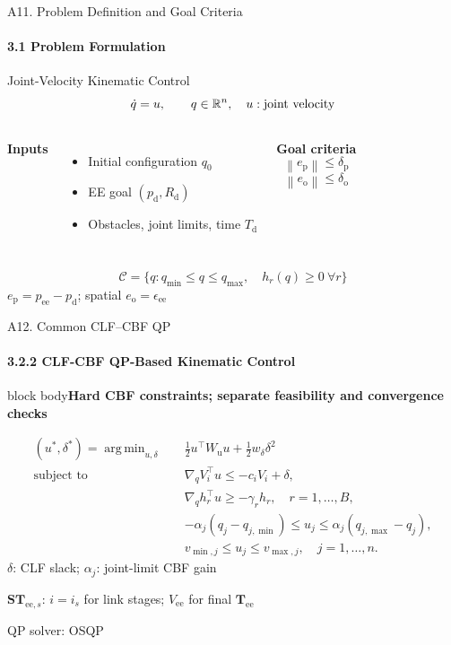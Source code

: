 \documentclass[t,10pt,handout]{beamer}
\newcommand{\takeaway}[1]{\par\begin{beamercolorbox}[sep=2mm,wd=\linewidth]{block body}\color{black}\textbf{#1}\end{beamercolorbox}\par\vspace{2mm}}
\newcommand{\ee}{\mathrm{ee}}
\newcommand{\regtask}{\mathbf{T}_{\ee}}
\newcommand{\subtask}[1]{\mathbf{ST}_{\ee,#1}}
\newcommand{\norm}[1]{\left\lVert#1\right\rVert}
\DeclareMathOperator*{\argmin}{arg\,min}
\newenvironment{slidebody}{\begin{minipage}[t][68.5mm][s]{\linewidth}\vspace{0pt}}{\par\vspace{0pt}\end{minipage}}
\begin{document}
\begin{frame}{A11. Problem Definition and Goal Criteria}
  \hypertarget{appendix-a11}{}
  \framesubtitle{3.1 Problem Formulation}
  \begin{slidebody}
    \begin{block}{Joint-Velocity Kinematic Control}
      \[\dot q=u,\qquad q\in{\mathbb R}^n,\quad u:\text{joint velocity}\]
    \end{block}
    \vfill
    \begin{columns}[T,onlytextwidth]
      \textbf{Inputs}
      \begin{itemize}\setlength{\itemsep}{3mm}
        \item Initial configuration $q_0$
        \item EE goal $(p_{\mathrm d},R_{\mathrm d})$
        \item Obstacles, joint limits, time $T_{\mathrm d}$
      \end{itemize}
      \textbf{Goal criteria}
      \[\norm{e_{\mathrm p}}\leq\delta_{\mathrm p}\]
      \[\norm{e_{\mathrm o}}\leq\delta_{\mathrm o}\]
    \end{columns}
    \vfill
    \[\mathcal C=\{q:q_{\min}\leq q\leq q_{\max},\quad h_r(q)\geq0\ \forall r\}\]
    \centering $e_{\mathrm p}=p_{\ee}-p_{\mathrm d}$; spatial $e_{\mathrm o}=\epsilon_{\ee}$\par
    \vfill

  \end{slidebody}
\end{frame}

\begin{frame}{A12. Common CLF--CBF QP}
  \hypertarget{appendix-a12}{}
  \framesubtitle{3.2.2 CLF-CBF QP-Based Kinematic Control}
  \begin{slidebody}
    \takeaway{Hard CBF constraints; separate feasibility and convergence checks}
    \setlength{\abovedisplayskip}{4pt}\setlength{\belowdisplayskip}{4pt}
    \begin{align*}
      (u^*,\delta^*)=\argmin_{u,\delta}\quad
       & \tfrac12u^\top W_{\mathrm{u}} u+\tfrac12w_\delta\delta^2 \\[1mm]
      \text{subject to}\quad
       & \nabla_q V_i^\top u\leq-c_iV_i+\delta,                   \\[1mm]
       & \nabla_q h_r^\top u\geq-\gamma_rh_r,\quad r=1,\ldots,B,  \\[1mm]
       & -\alpha_j(q_j-q_{j,\min})\leq u_j
      \leq\alpha_j(q_{j,\max}-q_j),                               \\[1mm]
       & v_{\min,j}\leq u_j\leq v_{\max,j},\quad j=1,\ldots,n.
    \end{align*}
    \vfill
    $\delta$: CLF slack; $\alpha_j$: joint-limit CBF gain\par\vspace{2mm}
    $\subtask{s}$: $i=i_s$ for link stages; $V_{\ee}$ for final $\regtask$\par\vfill
    \centering QP solver: OSQP~\cite{stellato2020osqp}
  \end{slidebody}
\end{frame}
\end{document}
